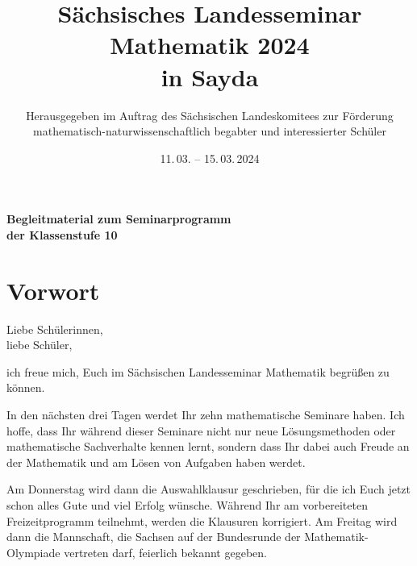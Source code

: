 \documentclass[a4paper, 12pt]{article}
\begin{document}
	\sffamily
	\title{\Huge \textbf{Sächsisches Landesseminar} \\ \textbf{Mathematik 2024}\\ in Sayda}
	\author{}
	\date{11.\,03. -- 15.\,03.\,2024}
	\maketitle
	
	\renewcommand{\baselinestretch}{1.5} \LARGE
	
	
	
	\vspace{3cm}
	
	\begin{center}\Huge
		\textbf{Begleitmaterial zum Seminarprogramm \\ der Klassenstufe 10}
	\end{center}
	
	\thispagestyle{empty}
	
	\renewcommand{\baselinestretch}{1.0}\normalsize\rmfamily
	
	\vfill
	
	\author{Herausgegeben im Auftrag des Sächsischen Landeskomitees zur Förderung\\ mathematisch-naturwissenschaftlich begabter und interessierter Schüler}
	
	\newpage
	
	\section*{Vorwort}
	
	Liebe Schülerinnen,\\
	liebe Schüler,
	
	ich freue mich, Euch im Sächsischen Landesseminar Mathematik begrüßen zu können.
	
	In den nächsten drei Tagen werdet Ihr zehn mathematische Seminare haben. Ich hoffe, dass Ihr während dieser Seminare nicht nur neue Lösungsmethoden oder mathematische Sachverhalte kennen lernt, sondern dass Ihr dabei auch Freude an der Mathematik und am Lösen von Aufgaben haben werdet.
	
	Am Donnerstag wird dann die Auswahlklausur geschrieben, für die ich Euch jetzt schon alles Gute und viel Erfolg wünsche. Während Ihr am vorbereiteten Freizeitprogramm teilnehmt, werden die Klausuren korrigiert. Am Freitag wird dann die Mannschaft, die Sachsen auf der Bundesrunde der Mathematik-Olympiade vertreten darf, feierlich bekannt gegeben.
	
\end{document}
